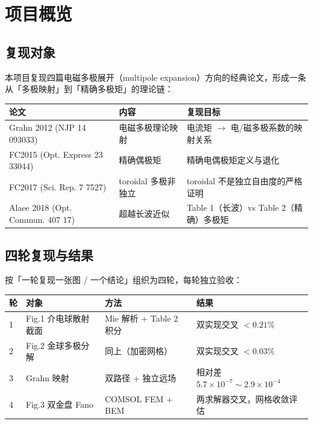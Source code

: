 \section{项目概览}

\subsection{复现对象}

本项目复现四篇电磁多极展开（multipole expansion）方向的经典论文，形成一条从「多极映射」到「精确多极矩」的理论链：

\begin{table}[H]
\centering\small
\begin{tabular}{@{}lll@{}}
\toprule
论文 & 内容 & 复现目标 \\
\midrule
Grahn 2012 (NJP 14 093033) & 电磁多极理论映射 & 电流矩 $\to$ 电/磁多极系数的映射关系 \\
FC2015 (Opt. Express 23 33044) & 精确偶极矩 & 精确电偶极矩定义与退化 \\
FC2017 (Sci. Rep. 7 7527) & toroidal 多极非独立 & toroidal 不是独立自由度的严格证明 \\
Alaee 2018 (Opt. Commun. 407 17) & 超越长波近似 & Table 1（长波）vs Table 2（精确）多极矩 \\
\bottomrule
\end{tabular}
\end{table}

\subsection{四轮复现与结果}

按「一轮复现一张图 / 一个结论」组织为四轮，每轮独立验收：

\begin{table}[H]
\centering\small
\begin{tabular}{@{}llll@{}}
\toprule
轮 & 对象 & 方法 & 结果 \\
\midrule
1 & Fig.1 介电球散射截面 & Mie 解析 + Table 2 积分 & 双实现交叉 $<0.21\%$ \\
2 & Fig.2 金球多极分解 & 同上（加密网格） & 双实现交叉 $<0.03\%$ \\
3 & Grahn 映射 & 双路径 + 独立远场 & 相对差 $5.7\times10^{-7}\sim2.9\times10^{-4}$ \\
4 & Fig.3 双金盘 Fano & COMSOL FEM + BEM & 两求解器交叉，网格收敛评估 \\
\bottomrule
\end{tabular}
\end{table}

